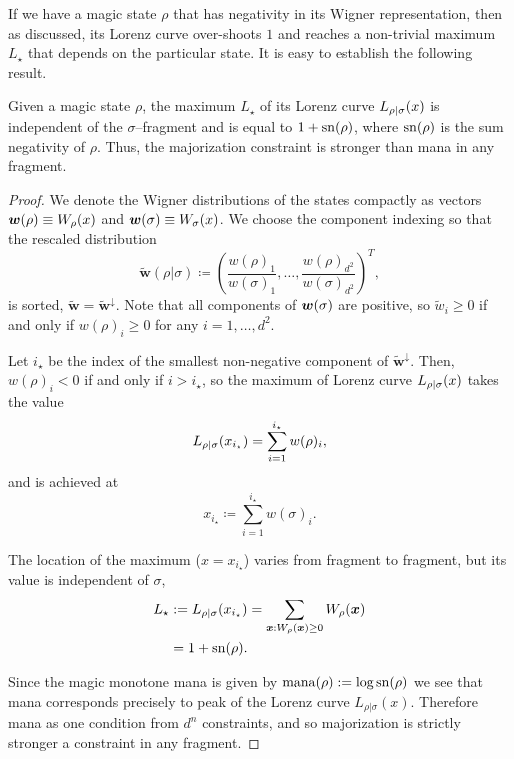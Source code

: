 \documentclass[pra,
aps,
twocolumn,
superscriptaddress,
groupedaddress,
nofootinbib,
reprint
]{revtex4-1}
\begin{document}
If we have a magic state $\rho$ that has negativity in its Wigner representation, then as discussed, its Lorenz curve over-shoots $1$ and reaches a non-trivial maximum $L_\star$ that depends on the particular state. It is easy to establish the following result.
\begin{lemma}\label{lem:lcmax}
	Given a magic state $\rho$, the maximum $L_\star$ of its Lorenz curve ${L_{\rho|\sigma}}(x)$ is independent of the $\sigma$--fragment and is equal to $1+{{\rm{sn}}(\rho)}$, where $\rm{sn}(\rho)$ is the sum negativity of $\rho$. Thus, the majorization constraint is stronger than mana in any fragment.
\end{lemma}
\begin{proof}
	We denote the Wigner distributions of the states compactly as vectors $\bm{w}(\rho) \equiv W_\rho(x)$ and $\bm{w}(\sigma) \equiv W_\sigma(x)$.
	We choose the component indexing so that the rescaled distribution 
	\begin{equation}
		\widetilde{\bm{w}}(\rho|\sigma) \coloneqq \left(\frac{w(\rho)_1}{w(\sigma)_1}, \dots, \frac{w(\rho)_{d^2}}{w(\sigma)_{d^2}} \right)^T,
	\end{equation}
	is sorted, $\widetilde{\bm{w}} = \widetilde{\bm{w}}^\downarrow$.
	Note that all components of $\bm{w}(\sigma)$ are positive, so $\widetilde{w}_i \geq 0$ if and only if $w(\rho)_i \geq 0$ for any $i=1,\dots,d^2$.
	
	Let $i_\star$ be the index of the smallest non-negative component of $\widetilde{\bm{w}}^\downarrow$.
	Then, $w(\rho)_i < 0$ if and only if $i > i_\star$, so the maximum of Lorenz curve ${L_{\rho|\sigma}}(x)$ takes the value 
	\begin{equation}
		{L_{\rho|\sigma}}(x_{i_\star}) = \sum_{i=1}^{i_\star} w(\rho)_i,
	\end{equation}
	and is achieved at
	\begin{equation}\label{eq:maxloc}
		x_{i_\star} \coloneqq \sum_{i=1}^{i_\star} w(\sigma)_i.
	\end{equation}

	The location of the maximum ($x=x_{i_\star}$) varies from fragment to fragment, but its value is independent of $\sigma$,
	\begin{align}
	L_\star &:=	\lc{\rho}{\sigma}(x_{i_\star}) 
		= \sum\limits_{\bmx: \W[\bmx]{\rho} \geq 0} \W[\bmx]{\rho} \nonumber \\
		&= 1 + \sn{\rho}.
	\end{align}
	
Since the magic monotone mana is given by $\rm{mana}(\rho) := \log \rm{sn}(\rho)$ we see that mana corresponds precisely to peak of the Lorenz curve $L_{\rho|\sigma}(x)$. Therefore mana as one condition from $d^n$ constraints, and so majorization is strictly stronger a constraint in any fragment.
\end{proof}
\end{document}
